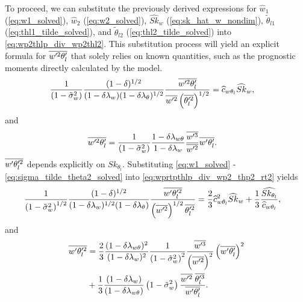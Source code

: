 To proceed, we can substitute the previously derived expressions for
$\widehat{w}_1$ (\cref{eq:w1_solved}), $\widehat{w}_2$ (\cref{eq:w2_solved}),
$\widehat{Sk}_w$ (\cref{eq:sk_hat_w_nondim}),
$\tilde{\theta}_{l1}$ (\cref{eq:thl1_tilde_solved}),
and $\tilde{\theta}_{l2}$ (\cref{eq:thl2_tilde_solved}) into \cref{eq:wp2thlp_div_wp2thl2}.
This substitution process will yield an explicit formula for $\overline{w'^2 \theta_l'}$ that solely relies on known quantities,
such as the prognostic moments directly calculated by the model.
\begin{align}
    \label{eq:wp2thlp_sk_w_solved}
    \frac{1}{\left( 1 - \tilde{\sigma}_w^2 \right)} \frac{(1-\delta)^{1/2}}{(1-\delta \lambda_w) (1-\delta \lambda_\theta)^{1/2}} \frac{\overline{w'^2\theta_l'}}{\overline{w'^2} \left(\overline{\theta_l'^2} \right)^{1/2}}
    &= \widehat{c}_{w\theta_l} \widehat{Sk}_w,
\end{align}
and
\begin{align}
    \label{eq:wp2thlp_solved}
    \overline{w'^2\theta_l'}
    &= \frac{1}{\left( 1 - \tilde{\sigma}_w^2 \right)} \frac{1 - \delta \lambda_{w\theta}}{1-\delta \lambda_w} \frac{\overline{w'^3}}{\overline{w'^2}} \overline{w'\theta_l'}.
\end{align}
$\overline{w' \theta_l'^2}$ depends explicitly on $Sk_{\theta_l}$.
Substituting \cref{eq:w1_solved} - \cref{eq:sigma_tilde_theta2_solved}
into \cref{eq:wprtpthlp_div_wp2_thp2_rt2} yields
\begin{align}
    \label{eq:wpthlp2_sk_w_solved}
    \frac{1}{\left( 1 - \tilde{\sigma}_w^2 \right)^{1/2}} \frac{(1-\delta)^{1/2}}{(1-\delta \lambda_w)^{1/2} (1-\delta \lambda_\theta)} \frac{\overline{w'\theta_l'^2}}{\left(\overline{w'^2}\right)^{1/2} \overline{\theta_l'^2}}
    &= \frac{2}{3} \widehat{c}_{w\theta_l}^2 \widehat{Sk}_w + \frac{1}{3} \frac{ \widehat{Sk_{\theta_l}} } {\widehat{c}_{w\theta_l}},
\end{align}
and
\begin{align}
    \label{eq:wpthlp2_solved}
    \overline{w'\theta_l'^2}
    &= \frac{2}{3} \frac{(1-\delta \lambda_{w \theta})^2}{(1-\delta \lambda_w)^2} \frac{1}{\left( 1 - \tilde{\sigma}_w^2 \right)^2} \frac{\overline{w'^3}}{\left(\overline{w'^2} \right)^2} \left(\overline{w'\theta_l'} \right)^2 \nonumber\\
    &+ \frac{1}{3} \frac{(1-\delta \lambda_w)}{(1-\delta \lambda_{w \theta})} \left( 1 - \tilde{\sigma}_w^2 \right) \frac{\overline{w'^2} \; \overline{\theta_l'^3} }{\overline{w'\theta_l'}}.
\end{align}

